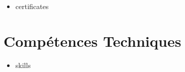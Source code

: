 \documentclass[10pt,a4paper]{article}
\begin{document}
\begin{itemize}[
  leftmargin=0.18in,
  label={},
  itemsep=1pt,
  topsep=2pt,
  parsep=0pt
]
\small
\item {{certificates}}
\end{itemize}

\vspace{-2pt}

\section{Compétences Techniques}

\begin{itemize}[
  leftmargin=0.18in,
  label={},
  itemsep=1pt,
  topsep=2pt,
  parsep=0pt
]
\small
\item {{skills}}
\end{itemize}
\end{document}
